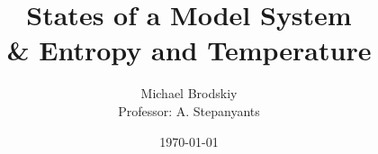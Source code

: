 


\title{States of a Model System\\ \& Entropy and Temperature}
\date{\today}
\author{Michael Brodskiy\\ \small Professor: A. Stepanyants}



\maketitle

